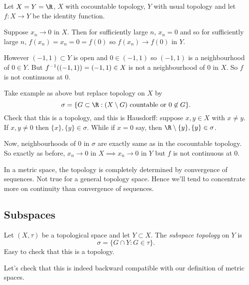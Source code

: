 \begin{example}
Let $X=Y=\R$, $X$ with cocountable topology, $Y$ with usual topology and let $f:X \to Y$ be the identity function.

Suppose $x_n \to 0$ in $X$. Then for sufficiently large $n$, $x_n=0$ and so for sufficiently large $n$, $f(x_n) = x_n = 0 = f(0)$ so $f(x_n) \to f(0)$ in $Y$.

However $(-1,1)\subset Y$ is open and $0\in (-1,1)$ so $(-1,1)$ is a neighbourhood of $0\in Y$. But $f^{-1}((-1,1)) = (-1,1)\in X$ is not a neighbourhood of $0$ in $X$. So $f$ is not continuous at $0$.
\end{example}
\begin{example}
Take example as above but replace topology on $X$ by \[\sigma = \{G\subset \R : (X \setminus G) \textup{ countable or } 0\not\in G \}. \]
Check that this is a topology, and this is Hausdorff: suppose $x,y\in X$ with $x\neq y$. If $x,y\neq 0$ then $\{x\}, \{y\}\in \sigma$. While if $x=0$ say, then $\R \setminus \{y\}, \{y\}\in \sigma$.

Now, neighbourhoods of $0$ in $\sigma$ are exactly same as in the cocountable topology. So exactly as before, $x_n \to 0$ in $X\implies x_n \to 0$ in $Y$ but $f$ is not continuous at $0$.
\end{example}
\begin{remark}
In a metric space, the topology is completely determined by convergence of sequences. Not true for a general topology space. Hence we'll tend to concentrate more on continuity than convergence of sequences.
\end{remark}

\subsection{Subspaces}
\vspace{3mm}
\begin{definition}
Let $(X,\tau)$ be a topological space and let $Y\subset X$. The \emph{subspace topology} on $Y$ is \[ \sigma = \{G\cap Y : G\in \tau \}.\] Easy to check that this is a topology.
\end{definition}

Let's check that this is indeed backward compatible with our definition of metric spaces.

